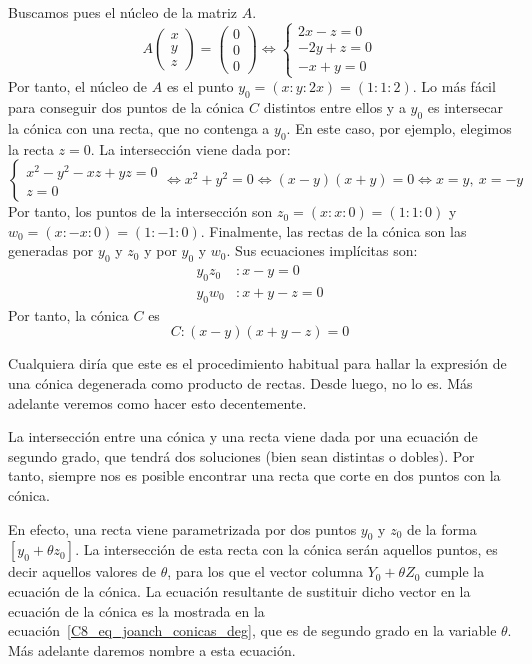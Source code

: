 \begin{exa}
	Buscamos pues el núcleo de la matriz $A$.
	\begin{equation}
	A\left( \begin{array}{c}
	x\\y\\z
	\end{array}\right) =\left( \begin{array}{c}
	0\\0\\0
	\end{array}\right)\Leftrightarrow
	\begin{cases}
	2x-z=0\\
	-2y+z=0\\
	-x+y=0
	\end{cases}
	\end{equation}
	Por tanto, el núcleo de $A$ es el punto $y_0=(x:y:2x)=(1:1:2)$. Lo más fácil para conseguir dos puntos de la cónica $C$ distintos entre ellos y a $y_0$ es intersecar la cónica con una recta, que no contenga a $y_0$. En este caso, por ejemplo, elegimos la recta $z=0$. La intersección viene dada por:
	\begin{equation}
	\begin{cases}
	x^2-y^2-xz+yz=0\\
	z=0
	\end{cases}\Leftrightarrow x^2+y^2=0\Leftrightarrow (x-y)(x+y)=0\Leftrightarrow x=y, \ x=-y
	\end{equation}
	Por tanto, los puntos de la intersección son $z_0=(x:x:0)=(1:1:0)$ y $w_0=(x:-x:0)=(1:-1:0)$. Finalmente, las rectas de la cónica son las generadas por $y_0$ y $z_0$ y por $y_0$ y $w_0$. Sus ecuaciones implícitas son:
	\begin{equation}
	\begin{split}
	y_0z_0&:x-y=0\\
	y_0w_0&:x+y-z=0
	\end{split}
	\end{equation}
	Por tanto, la cónica $C$ es
	\begin{equation}
	C: (x-y)(x+y-z)=0
	\end{equation}
\end{exa}
Cualquiera diría que este es el procedimiento habitual para hallar la expresión de una cónica degenerada como producto de rectas. Desde luego, no lo es. Más adelante veremos como hacer esto decentemente.
\begin{obs}
	La intersección entre una cónica y una recta viene dada por una ecuación de segundo grado, que tendrá dos soluciones (bien sean distintas o dobles). Por tanto, siempre nos es posible encontrar una recta que corte en dos puntos con la cónica.
	
	En efecto, una recta viene parametrizada por dos puntos $y_0$ y $z_0$ de la forma $[y_0+\theta z_0]$. La intersección de esta recta con la cónica serán aquellos puntos, es decir aquellos valores de $\theta$, para los que el vector columna $Y_0+\theta Z_0$ cumple la ecuación de la cónica. La ecuación resultante de sustituir dicho vector en la ecuación de la cónica es la mostrada en la ecuación~\eqref{C8_eq_joanch_conicas_deg}, que es de segundo grado en la variable $\theta$. Más adelante daremos nombre a esta ecuación.
\end{obs}

